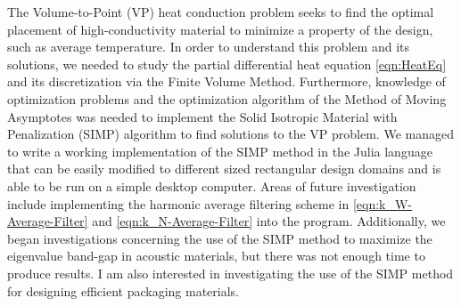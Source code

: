 The Volume-to-Point (VP) heat conduction problem seeks to find the optimal placement of high-conductivity material to minimize a property of the design, such as average temperature. In order to understand this problem and its solutions, we needed to study the partial differential heat equation \eqref{eqn:HeatEq} and its discretization via the Finite Volume Method. Furthermore, knowledge of optimization problems and the optimization algorithm of the Method of Moving Asymptotes was needed to implement the Solid Isotropic Material with Penalization (SIMP) algorithm to find solutions to the VP problem.
We managed to write a working implementation of the SIMP method in the Julia language that can be easily modified to different sized rectangular design domains and is able to be run on a simple desktop computer.
Areas of future investigation include implementing the harmonic average filtering scheme in \eqref{eqn:k_W-Average-Filter} and \eqref{eqn:k_N-Average-Filter} into the program. Additionally, we began investigations concerning the use of the SIMP method to maximize the eigenvalue band-gap in acoustic materials, but there was not enough time to produce results. I am also interested in investigating the use of the SIMP method for designing efficient packaging materials.